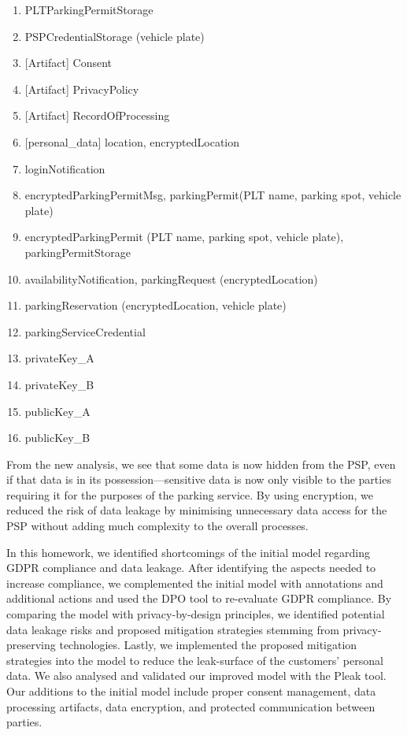 \begin{enumerate}
    \item PLTParkingPermitStorage
    \item PSPCredentialStorage (vehicle plate)
    \item {[Artifact]} Consent
    \item {[Artifact]} PrivacyPolicy
    \item {[Artifact]} RecordOfProcessing
    \item {[personal\_data]} location, encryptedLocation
    \item loginNotification
    \item encryptedParkingPermitMsg, parkingPermit(PLT name, parking spot,
    vehicle plate)
    \item encryptedParkingPermit (PLT name, parking spot, vehicle plate),
    parkingPermitStorage
    \item availabilityNotification, parkingRequest (encryptedLocation)
    \item parkingReservation (encryptedLocation, vehicle plate)
    \item parkingServiceCredential
    \item privateKey\_A
    \item privateKey\_B
    \item publicKey\_A
    \item publicKey\_B
\end{enumerate}

From the new analysis, we see that some data is now hidden from the PSP, even if
that data is in its possession---sensitive data is now only visible to the
parties requiring it for the purposes of the parking service. By using
encryption, we reduced the risk of data leakage by minimising unnecessary data
access for the PSP without adding much complexity to the overall processes.

In this homework, we identified shortcomings of the initial model regarding GDPR
compliance and data leakage. After identifying the aspects needed to increase
compliance, we complemented the initial model with annotations and additional
actions and used the DPO tool to re-evaluate GDPR compliance. By comparing the
model with privacy-by-design principles, we identified potential data leakage
risks and proposed mitigation strategies stemming from privacy-preserving
technologies. Lastly, we implemented the proposed mitigation strategies into the
model to reduce the leak-surface of the customers' personal data. We also
analysed and validated our improved model with the Pleak tool. Our additions to
the initial model include proper consent management, data processing artifacts,
data encryption, and protected communication between parties.
